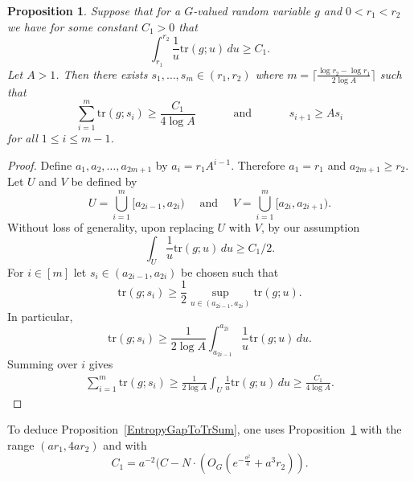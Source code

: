 \documentclass[10pt, english,oneside,reqno]{amsart}
\theoremstyle{plain}
\newtheorem{proposition}[theorem]{Proposition}
\theoremstyle{remark}
\numberwithin{equation}{section}
\numberwithin{figure}{section}
\newcommand{\tr}{\mathrm{tr}}
\begin{document}
\begin{proposition}\label{LotsOfTrace}
    Suppose that for a $G$-valued random variable $g$ and $0 < r_1 < r_2$ we have for some constant $C_1 > 0$ that $$\int_{r_1}^{r_2} \frac{1}{u} \tr(g; u) \, du \geq C_1.$$ Let $A > 1$. Then there exists $s_1, \dots, s_{m} \in (r_1, r_2)$ where $m = \lceil \frac{\log r_2 - \log r_1}{2\log A} \rceil$ such that
    \begin{equation*}
        \sum_{i=1}^m \tr (g ; s_i) \geq \frac{C_1}{4 \log A} \quad\quad\quad \text{ and } \quad\quad\quad s_{i+1} \geq A s_i
    \end{equation*}
    for all $1 \leq i \leq m-1$.
\end{proposition}

\begin{proof}
    Define $a_1, a_2, \ldots , a_{2m + 1}$ by $a_i = r_1A^{i-1}$. Therefore $a_1 = r_1$ and $a_{2m + 1} \geq r_2$. Let $U$ and $V$ be defined by $$U = \bigcup_{i = 1}^{m} [a_{2i-1}, a_{2i}) \quad \text{  and  } \quad V = \bigcup_{i = 1}^{m} [a_{2i}, a_{2i+1}).$$
    Without loss of generality, upon replacing $U$ with $V$, by our assumption  $$\int_U \frac{1}{u} \tr(g; u) \, du \geq C_1/2.$$
    For $i \in [m]$ let $s_i \in (a_{2i-1}, a_{2i})$ be chosen such that $$\tr(g; s_i) \geq \frac{1}{2}\sup_{u \in (a_{2i-1}, a_{2i})} \tr(g; u).$$ In particular, $$\tr(g; s_i) \geq \frac{1}{2 \log A } \int_{a_{2i-1}}^{a_{2i}} \frac{1}{u}\tr(g; u) \, du.$$ Summing over $i$ gives 
    \begin{align*}
        \sum_{i = 1}^{m} \tr(g; s_i) \geq \frac{1}{2 \log A} \int_U \frac{1}{u} \tr(g; u) \, du \geq \frac{C_1}{4 \log A}.
    \end{align*} 
\end{proof}

To deduce Proposition~\ref{EntropyGapToTrSum}, one uses Proposition~\ref{LotsOfTrace} with the range $(ar_1, 4ar_2)$ and with $$C_1 =  a^{-2}(C - N\cdot (O_G(e^{-\frac{a^2}{4}} + a^3r_2)).$$





\end{document}
